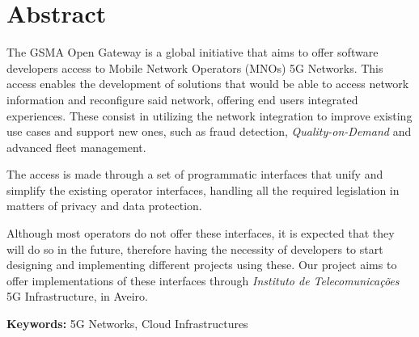 \chapter*{\Large\centering Abstract}
\thispagestyle{empty}

The GSMA Open Gateway is a global initiative that aims to offer
software developers access to Mobile Network Operators (MNOs) 5G
Networks. This access enables the development of solutions that
would be able to access network information and reconfigure said
network, offering end users integrated experiences. These consist
in utilizing the network integration to improve existing use
cases and support new ones, such as fraud detection,
\emph{Quality-on-Demand} and advanced fleet management.

The access is made through a set of programmatic interfaces that
unify and simplify the existing operator interfaces, handling all
the required legislation in matters of privacy and data
protection.

Although most operators do not offer these interfaces, it is
expected that they will do so in the future, therefore having the
necessity of developers to start designing and implementing
different projects using these. Our project aims to offer
implementations of these interfaces through \emph{Instituto de
Telecomunicações} 5G Infrastructure, in Aveiro.

\vspace{1cm}

\noindent\textbf{Keywords:} 5G Networks, Cloud Infrastructures

